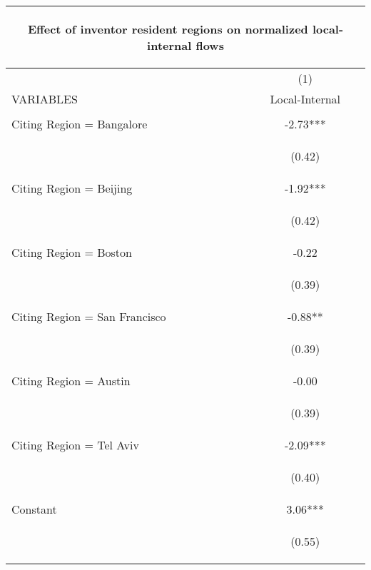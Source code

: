 \begin{center}
\begin{tabular}{lc}
\multicolumn{2}{c}{\begin{large}Effect of inventor resident regions on normalized local-internal flows \label{slocalinternal}\end{large}} \\ \hline
 & (1) \\
VARIABLES & Local-Internal \\ \hline
\vspace{4pt} & \begin{footnotesize}\end{footnotesize} \\
Citing Region = Bangalore & -2.73*** \\
\vspace{4pt} & \begin{footnotesize}(0.42)\end{footnotesize} \\
Citing Region = Beijing & -1.92*** \\
\vspace{4pt} & \begin{footnotesize}(0.42)\end{footnotesize} \\
Citing Region = Boston & -0.22 \\
\vspace{4pt} & \begin{footnotesize}(0.39)\end{footnotesize} \\
Citing Region = San Francisco & -0.88** \\
\vspace{4pt} & \begin{footnotesize}(0.39)\end{footnotesize} \\
Citing Region = Austin & -0.00 \\
\vspace{4pt} & \begin{footnotesize}(0.39)\end{footnotesize} \\
Citing Region = Tel Aviv & -2.09*** \\
\vspace{4pt} & \begin{footnotesize}(0.40)\end{footnotesize} \\
Constant & 3.06*** \\
 & \begin{footnotesize}(0.55)\end{footnotesize} \\

\end{tabular}
\end{center}
